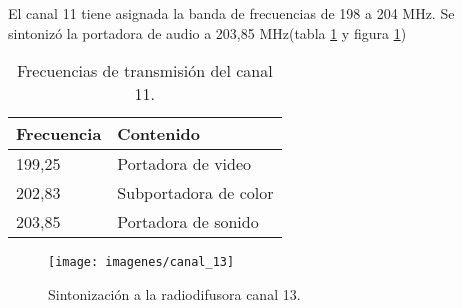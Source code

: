 \documentclass[../../labo_tp5_main.tex]{subfiles}
\begin{document}
El canal 11 tiene asignada la banda de frecuencias de 198 a 204 MHz. Se sintoniz\'o la portadora de audio a 203,85 MHz(tabla \ref{tab:canal11} y figura \ref{imagen})

\begin{table}[H]
\centering
\begin{tabular}{|l|l|}
\hline
Frecuencia & Contenido             \\ \hline
199,25     & Portadora de video    \\ \hline
202,83     & Subportadora de color \\ \hline
203,85     & Portadora de sonido   \\ \hline
\end{tabular}
\caption{Frecuencias de transmisi\'on del canal 11.}
\label{tab:canal11}
\end{table}

\begin{figure}[H]
	\centering
	\texttt{[image: imagenes/canal\_13]}
	\caption{Sintonizaci\'on a la radiodifusora canal 13.}
	\label{imagen}
\end{figure}
\end{document}
